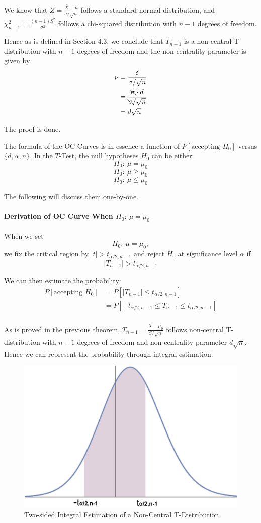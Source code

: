 \documentclass[a4paper]{article}
\begin{document}
We know that $Z = \displaystyle\frac{\overline{X}-\mu}{\sigma/\sqrt{n}}$ follows a standard normal distribution, and $\chi^2_{n-1} = \displaystyle\frac{(n-1)S^2}{\sigma^2}$ follows a chi-squared distribution with $n-1$ degrees of freedom.

Hence as is defined in Section 4.3, we conclude that $T_{n-1}$ is a non-central T distribution with $n-1$ degrees of freedom and the non-centrality parameter is given by
\begin{align*}
\nu 
&= \frac{\delta}{\sigma/\sqrt{n}}\\
&= \frac{\bcancel{\sigma}\cdot d}{\bcancel{\sigma}/\sqrt{n}}\\
&= d \sqrt{n}
\end{align*}

The proof is done.

The formula of the OC Curves is in essence a function of $P[\text{accepting }H_0]$ versus $\{d,\alpha,n\}$. In the $T$-Test, the null hypotheses $H_0$ can be either:
$$H_0:\ \mu = \mu_0$$
$$H_0:\ \mu \geq \mu_0$$
$$H_0:\ \mu \leq \mu_0$$

The following will discuss them one-by-one.

\paragraph{Derivation of OC Curve When $H_0:\ \mu = \mu_0$}
When we set
$$H_0:\ \mu = \mu_0,$$
we fix the critical region by $|t|>t_{\alpha/2,n-1}$ and reject $H_0$ at significance level $\alpha$ if
$$|T_{n-1}|>t_{\alpha/2,n-1}$$

We can then estimate the probability:
\begin{align*}
P[\text{accepting }H_0]
&= P[|T_{n-1}| \leq t_{\alpha/2,n-1}]\\
&= P[-t_{\alpha/2,n-1} \leq T_{n-1} \leq t_{\alpha/2,n-1}]\\
\end{align*}

As is proved in the previous theorem, $T_{n-1} = \displaystyle\frac{\overline{X}-\mu_0}{S/\sqrt{n}}$ follows non-central T-distribution with $n-1$ degrees of freedom and non-centrality parameter $d\sqrt{n}$. Hence we can represent the probability through integral estimation:

\begin{figure}[!htbp] 
\centering 
\includegraphics[width=0.6\linewidth]{nct2.png}  
\caption{Two-sided Integral Estimation of a Non-Central T-Distribution} 
\label{fig1}
\end{figure}
\end{document}
